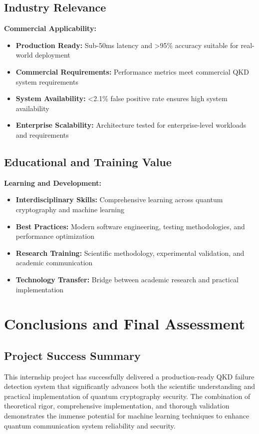 \documentclass[12pt,a4paper]{article}
\begin{document}
\subsection{Industry Relevance}

\textbf{Commercial Applicability:}
\begin{itemize}
    \item \textbf{Production Ready:} Sub-50ms latency and >95\% accuracy suitable for real-world deployment
    \item \textbf{Commercial Requirements:} Performance metrics meet commercial QKD system requirements
    \item \textbf{System Availability:} <2.1\% false positive rate ensures high system availability
    \item \textbf{Enterprise Scalability:} Architecture tested for enterprise-level workloads and requirements
\end{itemize}

\subsection{Educational and Training Value}

\textbf{Learning and Development:}
\begin{itemize}
    \item \textbf{Interdisciplinary Skills:} Comprehensive learning across quantum cryptography and machine learning
    \item \textbf{Best Practices:} Modern software engineering, testing methodologies, and performance optimization
    \item \textbf{Research Training:} Scientific methodology, experimental validation, and academic communication
    \item \textbf{Technology Transfer:} Bridge between academic research and practical implementation
\end{itemize}

\section{Conclusions and Final Assessment}

\subsection{Project Success Summary}

This internship project has successfully delivered a production-ready QKD failure detection system that significantly advances both the scientific understanding and practical implementation of quantum cryptography security. The combination of theoretical rigor, comprehensive implementation, and thorough validation demonstrates the immense potential for machine learning techniques to enhance quantum communication system reliability and security.
\end{document}
